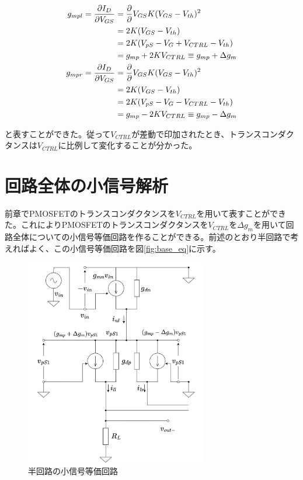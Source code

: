 \documentclass[twocolumn]{jsarticle}
\begin{document}
\begin{align}
    g_{mpl} = \frac{\partial I_{D}}{\partial V_{GS}} &= \frac{\partial}{\partial }V_{GS} K(V_{GS}-V_{th})^{2} \notag\\
    &=2K(V_{GS}-V_{th})    \notag\\ 
    &=2K(V_{pS}-V_{G}+V_{CTRL}-V_{th})  \notag\\
    &=g_{mp}+2KV_{CTRL}\equiv g_{mp}+\Delta g_{m}   \label{eq:g_mpl}\\
    g_{mpr} = \frac{\partial I_{D}}{\partial V_{GS}} &= \frac{\partial}{\partial }V_{GS} K(V_{GS}-V_{th})^{2} \notag\\
    &=2K(V_{GS}-V_{th})    \notag\\ 
    &=2K(V_{pS}-V_{G}-V_{CTRL}-V_{th})  \notag\\
    &=g_{mp}-2KV_{CTRL}\equiv g_{mp}-\Delta g_{m}   \label{eq:g_mpr}
\end{align}

と表すことができた。従って$V_{CTRL}$が差動で印加されたとき、トランスコンダクタンスは$V_{CTRL}$に比例して変化することが分かった。

\section{回路全体の小信号解析}
前章でPMOSFETのトランスコンダクタンスを$V_{CTRL}$を用いて表すことができた。これによりPMOSFETのトランスコンダクタンスを$V_{CTRL}$を$\Delta g_{m}$を用いて回路全体についての小信号等価回路を作ることができる。前述のとおり半回路で考えればよく、この小信号等価回路を図\eqref{fig:base_eq}に示す。

\begin{figure}[h]
    \begin{center}
        \includegraphics*[width=80mm]{figures/FoldedGilbertHalfBaseEquivalentCircuit.png}
        \caption{半回路の小信号等価回路}
        \label{fig:base_eq}
    \end{center}
\end{figure}
\end{document}
